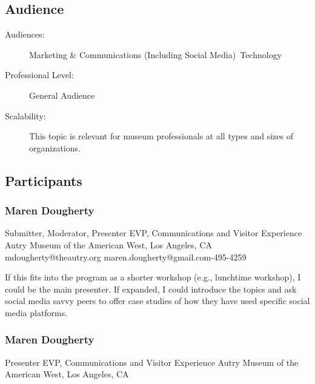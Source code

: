 \documentclass{report}
\begin{document}
              \subsection*{Audience}
                \begin{description}
                  \item [Audiences:]Marketing \& Communications (Including Social Media)~Technology~
                  \item[Professional Level:]General Audience~
                \item[Scalability:] This topic is relevant for museum professionals at all types and sizes of organizations.

							
              \end{description}
            \subsection*{Participants}
              \subsubsection*{ Maren Dougherty }
              Submitter, Moderator, Presenter\newline
              EVP, Communications and Visitor Experience\newline
              Autry Museum of the American West, Los Angeles, CA
              \newline
              mdougherty@theautry.org\newline
              maren.dougherty@gmail.com-495-4259\newline

              If this fits into the program as a shorter workshop (e.g., lunchtime workshop), I could be the main presenter. If expanded, I could introduce the topics and ask social media savvy peers to offer case studies of how they have used specific social media platforms.\newline


              

              
                \subsubsection*{ Maren Dougherty }
                Presenter\newline
                EVP, Communications and Visitor Experience\newline
                Autry Museum of the American West, Los Angeles, CA
                \newline
                
\end{document}
